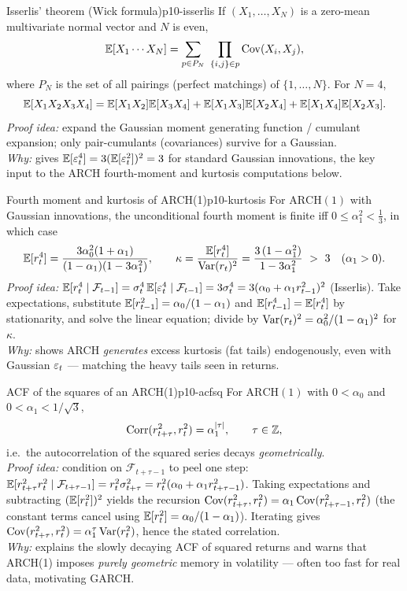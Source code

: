 \begin{theorem}{Isserlis' theorem (Wick formula)}{p10-isserlis}
If $(X_1,\dots,X_N)$ is a zero-mean multivariate normal vector and $N$ is even,
\[
\E[X_1\cdots X_N]=\sum_{p\in P_N}\ \prod_{\{i,j\}\in p}\Cov(X_i,X_j),
\]
where $P_N$ is the set of all pairings (perfect matchings) of $\{1,\dots,N\}$.
For $N=4$,
\[
\mathbb{E}[X_1X_2X_3X_4]=\mathbb{E}[X_1X_2]\mathbb{E}[X_3X_4]+\mathbb{E}[X_1X_3]\mathbb{E}[X_2X_4]+\mathbb{E}[X_1X_4]\mathbb{E}[X_2X_3].
\]
\textit{Proof idea:} expand the Gaussian moment generating function / cumulant
expansion; only pair-cumulants (covariances) survive for a Gaussian.\\
\textit{Why:} gives $\mathbb{E}[\varepsilon_t^4]=3(\mathbb{E}[\varepsilon_t^2])^2=3$ for standard Gaussian
innovations, the key input to the ARCH fourth-moment and kurtosis computations
below.
\end{theorem}

\begin{proposition}{Fourth moment and kurtosis of ARCH(1)}{p10-kurtosis}
For $\mathrm{ARCH}(1)$ with Gaussian innovations, the unconditional fourth moment
is finite iff $0\le\alpha_1^2<\tfrac13$, in which case
\[
\E[r_t^4]=\frac{3\alpha_0^2(1+\alpha_1)}{(1-\alpha_1)(1-3\alpha_1^2)},
\qquad
\kappa=\frac{\E[r_t^4]}{\Var(r_t)^2}=\frac{3\,(1-\alpha_1^2)}{1-3\alpha_1^2}\ >\ 3
\quad(\alpha_1>0).
\]
\textit{Proof idea:} $\mathbb{E}[r_t^4\mid\mathcal F_{t-1}]
=\sigma_t^4\,\mathbb{E}[\varepsilon_t^4\mid\mathcal F_{t-1}]=3\sigma_t^4=3(\alpha_0+\alpha_1 r_{t-1}^2)^2$
(Isserlis). Take expectations, substitute $\mathbb{E}[r_{t-1}^2]=\alpha_0/(1-\alpha_1)$
and $\mathbb{E}[r_{t-1}^4]=\mathbb{E}[r_t^4]$ by stationarity, and solve the linear equation;
divide by $\operatorname{Var}(r_t)^2=\alpha_0^2/(1-\alpha_1)^2$ for $\kappa$.\\
\textit{Why:} shows ARCH \emph{generates} excess kurtosis (fat tails) endogenously,
even with Gaussian $\varepsilon_t$ --- matching the heavy tails seen in returns.
\end{proposition}

\begin{proposition}{ACF of the squares of an ARCH(1)}{p10-acfsq}
For $\mathrm{ARCH}(1)$ with $0<\alpha_0$ and $0<\alpha_1<1/\sqrt3$,
\[
\operatorname{Corr}(r_{t+\tau}^2,r_t^2)=\alpha_1^{\left\lvert \tau \right\rvert},\qquad \tau\in\mathbb{Z},
\]
i.e.\ the autocorrelation of the squared series decays \emph{geometrically}.\\
\textit{Proof idea:} condition on $\mathcal F_{t+\tau-1}$ to peel one step:
$\mathbb{E}[r_{t+\tau}^2 r_t^2\mid\mathcal F_{t+\tau-1}]=r_t^2\sigma_{t+\tau}^2
=r_t^2(\alpha_0+\alpha_1 r_{t+\tau-1}^2)$. Taking expectations and subtracting
$(\mathbb{E}[r_t^2])^2$ yields the recursion
$\operatorname{Cov}(r_{t+\tau}^2,r_t^2)=\alpha_1\operatorname{Cov}(r_{t+\tau-1}^2,r_t^2)$ (the constant terms
cancel using $\mathbb{E}[r_t^2]=\alpha_0/(1-\alpha_1)$). Iterating gives
$\operatorname{Cov}(r_{t+\tau}^2,r_t^2)=\alpha_1^{\tau}\operatorname{Var}(r_t^2)$, hence the stated
correlation.\\
\textit{Why:} explains the slowly decaying ACF of squared returns and warns that
ARCH(1) imposes \emph{purely geometric} memory in volatility --- often too fast
for real data, motivating GARCH.
\end{proposition}

